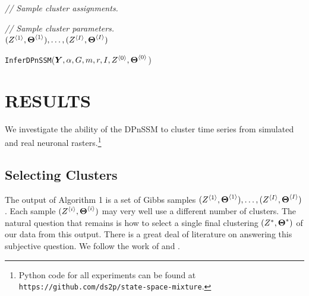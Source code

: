 \documentclass[twoside]{article}
\begin{document}
\begin{algorithm}
  \begin{algorithmic}[1]
	\item[\quad \quad \emph{// Sample cluster assignments.}]
		\EndFor
	\EndFor
	\item[\quad \quad \emph{// Sample cluster parameters.}]
		\EndFor
	\EndFor
  \EndFor \\
  \Return $(Z^{\langle1\rangle}_{}, \boldsymbol{\Theta}^{\langle1\rangle}_{}), \ldots, (Z^{\langle I\rangle}_{}, \boldsymbol{\Theta}^{\langle I\rangle}_{})$
  \end{algorithmic}
  \caption{\texttt{InferDPnSSM}($\boldsymbol{Y}, \alpha, G, m, r, I, Z^{\langle0\rangle}_{}, \boldsymbol{\Theta}^{\langle0\rangle}_{}$)} \label{alg}
\end{algorithm}


\section{RESULTS}
We investigate the ability of the DPnSSM to cluster time series from simulated and real neuronal rasters.\footnote{Python code for all experiments can be found at \texttt{https://github.com/ds2p/state-space-mixture}.}

\subsection{Selecting Clusters} \label{ssec:sel-clust}
The output of Algorithm 1 is a set of Gibbs samples $(Z^{\langle1\rangle}_{}, \boldsymbol{\Theta}^{\langle1\rangle}_{}), \ldots, (Z^{\langle I\rangle}_{}, \boldsymbol{\Theta}^{\langle I\rangle}_{})$.  Each sample $(Z^{\langle i\rangle}_{}, \boldsymbol{\Theta}^{\langle i\rangle}_{})$ may very well use a different number of clusters.  The natural question that remains is how to select a single final clustering $(Z^*, \boldsymbol{\Theta}^*)$ of our data from this output.  There is a great deal of literature on answering this subjective question.  We follow the work of \cite{dahl2006model} and \cite{nieto2014bayesian}.  
\end{document}
